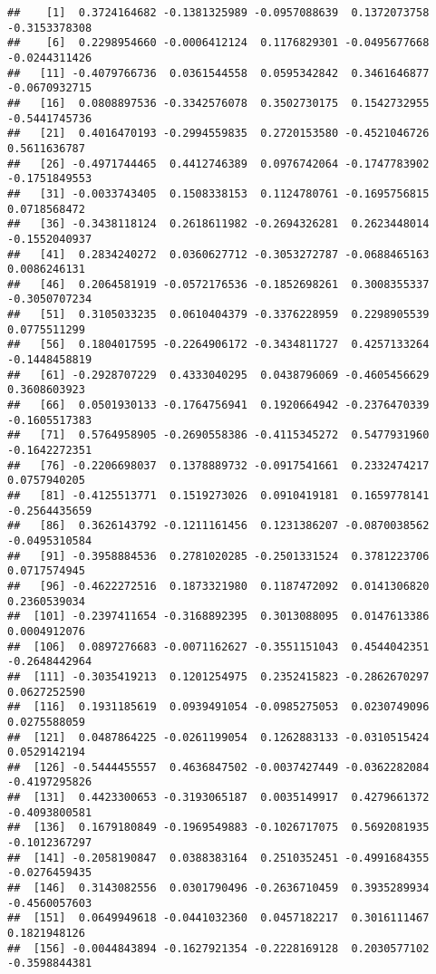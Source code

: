 \documentclass[
]{article}
\begin{document}
\begin{verbatim}
##    [1]  0.3724164682 -0.1381325989 -0.0957088639  0.1372073758 -0.3153378308
##    [6]  0.2298954660 -0.0006412124  0.1176829301 -0.0495677668 -0.0244311426
##   [11] -0.4079766736  0.0361544558  0.0595342842  0.3461646877 -0.0670932715
##   [16]  0.0808897536 -0.3342576078  0.3502730175  0.1542732955 -0.5441745736
##   [21]  0.4016470193 -0.2994559835  0.2720153580 -0.4521046726  0.5611636787
##   [26] -0.4971744465  0.4412746389  0.0976742064 -0.1747783902 -0.1751849553
##   [31] -0.0033743405  0.1508338153  0.1124780761 -0.1695756815  0.0718568472
##   [36] -0.3438118124  0.2618611982 -0.2694326281  0.2623448014 -0.1552040937
##   [41]  0.2834240272  0.0360627712 -0.3053272787 -0.0688465163  0.0086246131
##   [46]  0.2064581919 -0.0572176536 -0.1852698261  0.3008355337 -0.3050707234
##   [51]  0.3105033235  0.0610404379 -0.3376228959  0.2298905539  0.0775511299
##   [56]  0.1804017595 -0.2264906172 -0.3434811727  0.4257133264 -0.1448458819
##   [61] -0.2928707229  0.4333040295  0.0438796069 -0.4605456629  0.3608603923
##   [66]  0.0501930133 -0.1764756941  0.1920664942 -0.2376470339 -0.1605517383
##   [71]  0.5764958905 -0.2690558386 -0.4115345272  0.5477931960 -0.1642272351
##   [76] -0.2206698037  0.1378889732 -0.0917541661  0.2332474217  0.0757940205
##   [81] -0.4125513771  0.1519273026  0.0910419181  0.1659778141 -0.2564435659
##   [86]  0.3626143792 -0.1211161456  0.1231386207 -0.0870038562 -0.0495310584
##   [91] -0.3958884536  0.2781020285 -0.2501331524  0.3781223706  0.0717574945
##   [96] -0.4622272516  0.1873321980  0.1187472092  0.0141306820  0.2360539034
##  [101] -0.2397411654 -0.3168892395  0.3013088095  0.0147613386  0.0004912076
##  [106]  0.0897276683 -0.0071162627 -0.3551151043  0.4544042351 -0.2648442964
##  [111] -0.3035419213  0.1201254975  0.2352415823 -0.2862670297  0.0627252590
##  [116]  0.1931185619  0.0939491054 -0.0985275053  0.0230749096  0.0275588059
##  [121]  0.0487864225 -0.0261199054  0.1262883133 -0.0310515424  0.0529142194
##  [126] -0.5444455557  0.4636847502 -0.0037427449 -0.0362282084 -0.4197295826
##  [131]  0.4423300653 -0.3193065187  0.0035149917  0.4279661372 -0.4093800581
##  [136]  0.1679180849 -0.1969549883 -0.1026717075  0.5692081935 -0.1012367297
##  [141] -0.2058190847  0.0388383164  0.2510352451 -0.4991684355 -0.0276459435
##  [146]  0.3143082556  0.0301790496 -0.2636710459  0.3935289934 -0.4560057603
##  [151]  0.0649949618 -0.0441032360  0.0457182217  0.3016111467  0.1821948126
##  [156] -0.0044843894 -0.1627921354 -0.2228169128  0.2030577102 -0.3598844381

\end{verbatim}
\end{document}
